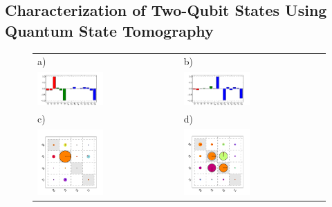 \subsection{Characterization of Two-Qubit States Using Quantum State Tomography}

\begin{figure}[ht!]
	\centering
	\begin{tabular}{ll}
	a) & b) \\
	\includegraphics[width=0.48\textwidth]{"./data/ct5/2011_04_21 - grover and tomo/good_data/pauli_set_2"} & \includegraphics[width=0.48\textwidth]{"./data/ct5/2011_04_21 - grover and tomo/good_data/pauli_set_3"} \\
	c) & d) \\
	\includegraphics[width=0.48\textwidth]{"./data/ct5/2011_04_21 - grover and tomo/good_data/input_matrices_1"} & \includegraphics[width=0.48\textwidth]{"./data/ct5/2011_04_21 - grover and tomo/good_data/output_matrices_1"} \\

\end{tabular}
\end{figure}
